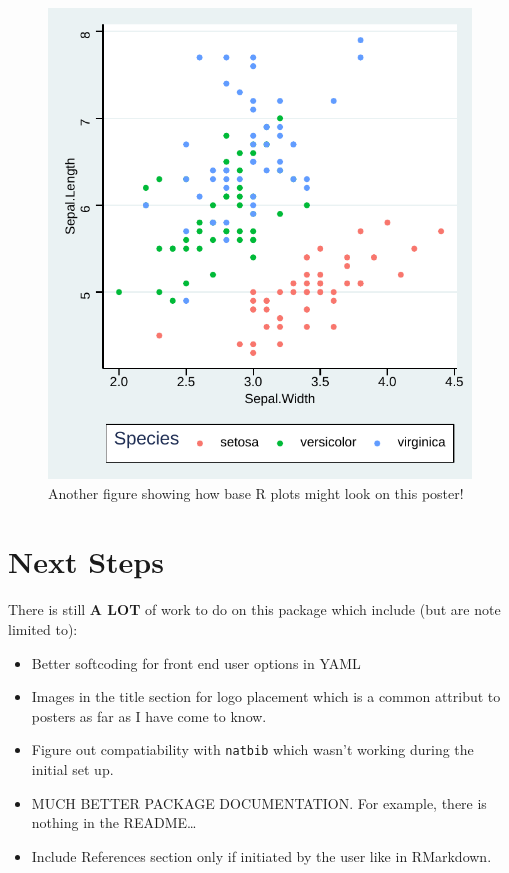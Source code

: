 \documentclass[article,30pt,extrafontsizes]{memoir}
\begin{document}
\begin{adjmulticols*}{3}{10mm}{10mm}
{\begin{figure}
{\centering \includegraphics[width=0.8\linewidth]{skeleton_files/figure-latex/unnamed-chunk-6-1} 

}

\caption{Another figure showing how base R plots might look on this poster!}\label{fig:unnamed-chunk-6}
\end{figure}

\section{Next Steps}\label{next-steps}

There is still \textbf{A LOT} of work to do on this package which
include (but are note limited to):

\begin{itemize}
\tightlist
\item
  Better softcoding for front end user options in YAML
\item
  Images in the title section for logo placement which is a common
  attribut to posters as far as I have come to know.
\item
  Figure out compatiability with \texttt{natbib} which wasn't working
  during the initial set up.
\item
  MUCH BETTER PACKAGE DOCUMENTATION. For example, there is nothing in
  the README\ldots{}
\item
  Include References section only if initiated by the user like in
  RMarkdown.
\end{itemize}

\small\printbibliography
}
\end{adjmulticols*}
\end{document}
